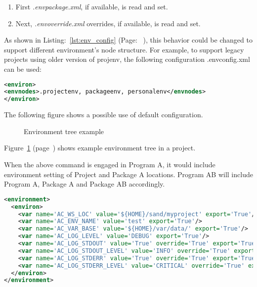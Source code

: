 \documentclass[design.tex]{subfiles}
\begin{document}
\begin{enumerate}
	\item First \emph{.envpackage.xml}, if available, is read and set.
	\item Next, \emph{.envoverride.xml} overrides, if available, is read and set.
\end{enumerate} 

As shown in Listing:~\ref{lst:env_config} (Page: ~\pageref{lst:env_config}), this behavior could be changed to support different environment's node structure.  For example, to support legacy projects using older version of projenv, the following configuration .envconfig.xml can be used:

\begin{lstlisting}[language=XML, label=lst:env_config, caption=Example for project configuration environment file]
<environ>
<envnodes>.projectenv, packageenv, personalenv</envnodes>
</environ>
\end{lstlisting}

The following figure shows a possible use of default configuration.
\begin{figure}[h]
	\centering
	\caption{Environment tree example}
	\label{fig:environment_tree}
\end{figure}

Figure~\ref{fig:environment_tree} (page~\pageref{fig:environment_tree}) shows example environment tree in a project.

When the above command is engaged in Program A, it would include environment setting of Project and Package A locations.  Program AB will include Program A, Package A and Package AB accordingly.


\begin{minipage}{0.9\textwidth}
	\begin{lstlisting}[language=XML, label=lst:project_env, caption=Example for project environment file]
<environment>
  <environ>
    <var name='AC_WS_LOC' value='${HOME}/sand/myproject' export='True'/>
    <var name='AC_ENV_NAME' value='test' export='True'/>
    <var name='AC_VAR_BASE' value='${HOME}/var/data/' export='True'/>
    <var name='AC_LOG_LEVEL' value='DEBUG' export='True'/> 
    <var name='AC_LOG_STDOUT' value='True' override='True' export='True' cast='boolean'/>
    <var name='AC_LOG_STDOUT_LEVEL' value='INFO' override='True' export='True'/>
    <var name='AC_LOG_STDERR' value='True' override='True' export='True' cast='boolean'/>
    <var name='AC_LOG_STDERR_LEVEL' value='CRITICAL' override='True' export='True'/>
  </environ>
</environment>
	\end{lstlisting}
\end{minipage}
\end{document}
